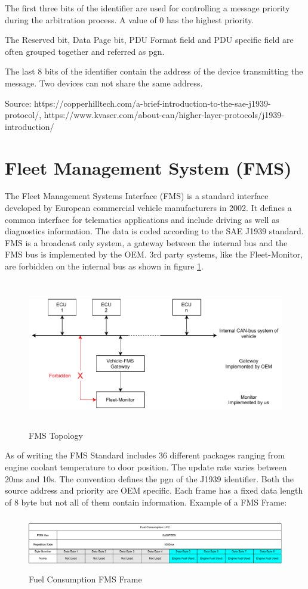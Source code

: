 The first three bits of the identifier are used for controlling a message priority during the arbitration process. A value of 0 has the highest priority.

The Reserved bit, Data Page bit, PDU Format field and PDU specific field are often grouped together and referred as \acrfull{pgn}. 

The last 8 bits of the identifier contain the address of the device transmitting the message. Two devices can not share the same address.


Source: https://copperhilltech.com/a-brief-introduction-to-the-sae-j1939-protocol/,
https://www.kvaser.com/about-can/higher-layer-protocols/j1939-introduction/
\newpage

\section{Fleet Management System (FMS)}
The Fleet Management Systems Interface (FMS) is a standard interface developed by European commercial vehicle manufacturers in 2002. It defines a common interface for telematics applications and include driving as well as diagnostics information. The data is coded according to the SAE J1939 standard. FMS is a broadcast only system, a gateway between the internal bus and the FMS bus is implemented by the OEM. 3rd party systems, like the Fleet-Monitor, are forbidden on the internal bus as shown in figure \ref{fig:fms-bus}. 

\begin{figure}[h!]
	\centering
	\hfuzz=14.0pt
	\includegraphics[height=6.5cm]{images/fms-bus}
	\caption{FMS Topology}
	\vspace{-1.4ex}
	\label{fig:fms-bus}
\end{figure}

As of writing the FMS Standard includes 36 different packages ranging from engine coolant temperature to door position. The update rate varies between 20ms and 10s. The convention defines the \acrfull{pgn} of the J1939 identifier. Both the source address and priority are OEM specific. Each frame has a fixed data length of 8 byte but not all of them contain information. Example of a FMS Frame:

\begin{figure}[h!]
	\centering
	\hfuzz=11.0pt
	\includegraphics[height=2.4cm]{images/fms-frame}
	\caption{Fuel Consumption FMS Frame}
	\vspace{-1.4ex}
	\label{fig:fms-frame}
\end{figure}

